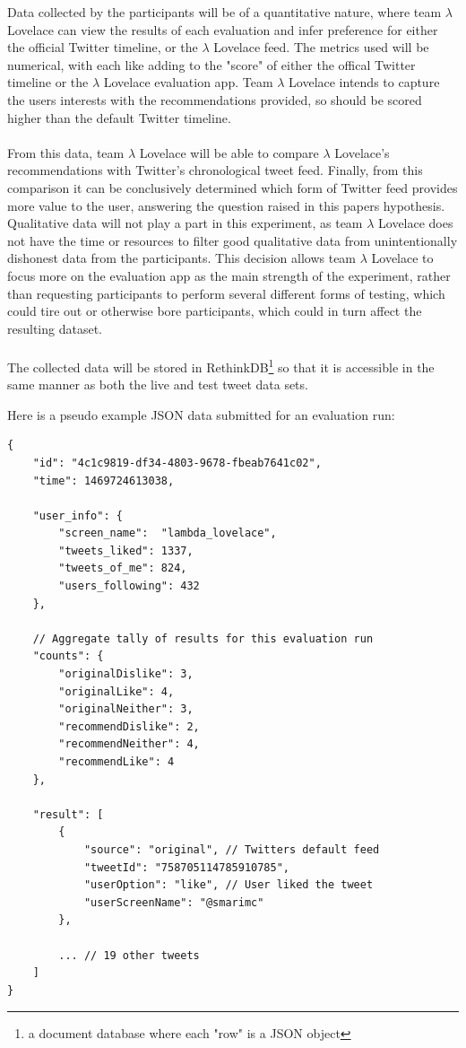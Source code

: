 \documentclass{article}
\begin{document}
Data collected by the participants will be of a quantitative nature, where team $\lambda$ Lovelace can view the results of each evaluation and infer preference for either the official Twitter timeline, or the $\lambda$ Lovelace feed. The metrics used will be numerical, with each like adding to the "score" of either the offical Twitter timeline or the $\lambda$ Lovelace evaluation app. Team $\lambda$ Lovelace intends to capture the users interests with the recommendations provided, so should be scored higher than the default Twitter timeline.
\\\\
From this data, team $\lambda$ Lovelace will be able to compare $\lambda$ Lovelace's recommendations with Twitter's chronological tweet feed. Finally, from this comparison it can be conclusively determined which form of Twitter feed provides more value to the user, answering the question raised in this papers hypothesis. Qualitative data will not play a part in this experiment, as team $\lambda$ Lovelace does not have the time or resources to filter good qualitative data from unintentionally dishonest data from the participants. This decision allows team $\lambda$ Lovelace to focus more on the evaluation app as the main strength of the experiment, rather than requesting participants to perform several different forms of testing, which could tire out or otherwise bore participants, which could in turn affect the resulting dataset.
\\\\
The collected data will be stored in RethinkDB\footnote{a document database where each "row" is a JSON object} so that it is accessible in the same manner as both the live and test tweet data sets. 

\begin{samepage}
\noindent Here is a pseudo example JSON data submitted for an evaluation run:
\begin{verbatim}
{
    "id": "4c1c9819-df34-4803-9678-fbeab7641c02",
    "time": 1469724613038,
    
    "user_info": {
        "screen_name":  "lambda_lovelace",
        "tweets_liked": 1337,
        "tweets_of_me": 824,
        "users_following": 432
    },

    // Aggregate tally of results for this evaluation run
    "counts": {
        "originalDislike": 3,
        "originalLike": 4,
        "originalNeither": 3,
        "recommendDislike": 2,
        "recommendNeither": 4,
        "recommendLike": 4
    },
    
    "result": [
        {
            "source": "original", // Twitters default feed
            "tweetId": "758705114785910785",
            "userOption": "like", // User liked the tweet
            "userScreenName": "@smarimc"
        },
        
        ... // 19 other tweets
    ]
}
\end{verbatim}
\end{samepage}
\end{document}
